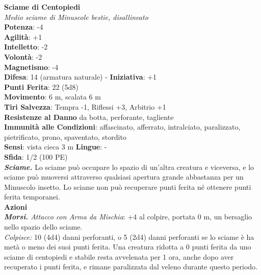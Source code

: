 \begin{multicols}{2}
\medskip\textbf{Sciame di Centopiedi}\\
\emph{Medio sciame di Minuscole bestie, disallineato}\\
\textbf{Potenza}: -4\\
\textbf{Agilità}: +1\\
\textbf{Intelletto}: -2\\
\textbf{Volontà}: -2\\
\textbf{Magnetismo}: -4\\
\textbf{Difesa}: 14 (armatura naturale) - \textbf{Iniziativa}: +1\\
\textbf{Punti Ferita}: 22 (5d8)\\
\textbf{Movimento}: 6 m, scalata 6 m\\
\textbf{Tiri Salvezza}: Tempra -1, Riflessi +3, Arbitrio +1\\
\textbf{Resistenze al Danno} da botta, perforante, tagliente\\
\textbf{Immunità alle Condizioni}: affascinato, afferrato, intralciato, paralizzato, pietrificato, prono, spaventato, stordito\\
\textbf{Sensi}: vista cieca 3 m
\textbf{Lingue}: -\\
\textbf{Sfida}: 1/2 (100 PE)\smallskip\\
\emph{\textbf{Sciame.}} Lo sciame può occupare lo spazio di un'altra creatura e viceversa, e lo sciame può muoversi attraverso qualsiasi apertura grande abbastanza per un Minuscolo insetto. Lo sciame non può recuperare punti ferita né ottenere punti ferita temporanei.\\
\smallskip\textbf{Azioni}\\
\emph{\textbf{Morsi.} Attacco con Arma da Mischia}: +4 al colpire, portata 0 m, un bersaglio nello spazio dello sciame.\\
\emph{Colpisce:} 10 (4d4) danni perforanti, o 5 (2d4) danni perforanti se lo sciame è ha metà o meno dei suoi punti ferita. Una creatura ridotta a 0 punti ferita da uno sciame di centopiedi e stabile resta avvelenata per 1 ora, anche dopo aver recuperato i punti ferita, e rimane paralizzata dal veleno durante questo periodo.\\


\end{multicols}
